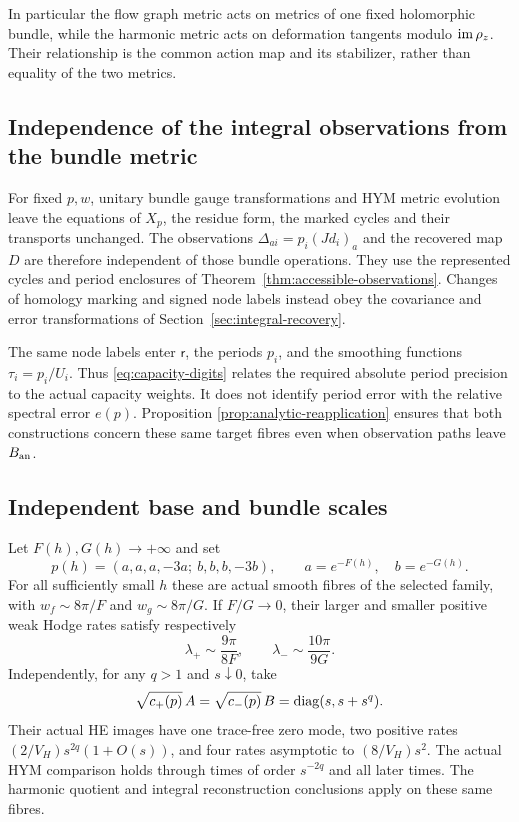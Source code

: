 In particular the flow graph metric acts on metrics
of one fixed holomorphic bundle, while the harmonic
metric acts on deformation tangents modulo $\operatorname{im}\rho_z$.
Their relationship is the common action map and its
stabilizer, rather than equality of the two metrics.

\subsection{Independence of the integral observations from the bundle metric}

For fixed $p,w$, unitary bundle gauge transformations and
HYM metric evolution leave the equations of $X_p$, the
residue form, the marked cycles and their transports unchanged.
The observations $\Delta_{ai}=p_i(Jd_i)_a$ and the recovered
map $D$ are therefore independent of those bundle operations.
They use the represented cycles and period enclosures of
Theorem~\ref{thm:accessible-observations}. Changes of homology
marking and signed node labels instead obey the covariance
and error transformations of Section~\ref{sec:integral-recovery}.

The same node labels enter $\mathsf r$, the periods
$p_i$, and the smoothing functions $\tau_i=p_i/U_i$.
Thus \eqref{eq:capacity-digits} relates the required
absolute period precision to the actual capacity
weights. It does not identify period error with the
relative spectral error $e(p)$. Proposition
\ref{prop:analytic-reapplication} ensures that both
constructions concern these same target fibres even
when observation paths leave $B_{\rm an}$.

\subsection{Independent base and bundle scales}

\begin{corollary}\label{cor:independent-scales}
Let $F(h),G(h)\to+\infty$ and set
\[
 p(h)=(a,a,a,-3a;\ b,b,b,-3b),\qquad
 a=e^{-F(h)},\quad b=e^{-G(h)}.
\]
For all sufficiently small $h$ these are actual smooth
fibres of the selected family, with
$w_f\sim8\pi/F$ and $w_g\sim8\pi/G$.
If $F/G\to0$, their larger and smaller positive weak
Hodge rates satisfy respectively
\[
 \lambda_+\sim\frac{9\pi}{8F},\qquad
 \lambda_-\sim\frac{10\pi}{9G}.
\]
Independently, for any $q>1$ and $s\downarrow0$, take
\[
 \sqrt{c_+(p)}\,A=\sqrt{c_-(p)}\,B
                              =\operatorname{diag}(s,s+s^q).
\]
Their actual HE images have one trace-free zero mode,
two positive rates
$(2/V_H)s^{2q}(1+O(s))$, and four rates asymptotic to
$(8/V_H)s^2$. The actual HYM comparison holds through
times of order $s^{-2q}$ and all later times.
The harmonic quotient and integral reconstruction
conclusions apply on these same fibres.
\end{corollary}

